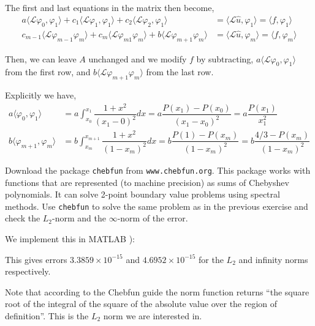 \documentclass[10pt]{article}
\begin{document}
\begin{solution}[Solution]
\begin{enumerate}
        The first and last equations in the matrix then become,
        \begin{align*}
            a\langle \mathcal{L}\varphi_0, \varphi_1\rangle
            + c_1\langle \mathcal{L}\varphi_1, \varphi_1\rangle
            + c_2\langle \mathcal{L}\varphi_2, \varphi_1\rangle
            &= \langle \mathcal{L}\hat{u},\varphi_1 \rangle = \langle f, \varphi_1 \rangle \\ 
            c_{m-1}\langle \mathcal{L}\varphi_{m-1}\varphi_m \rangle
            +c_{m}\langle \mathcal{L}\varphi_{m1}\varphi_m \rangle
            +b\langle \mathcal{L}\varphi_{m+1}\varphi_m \rangle
            &= \langle \mathcal{L}\hat{u},\varphi_m \rangle = \langle f, \varphi_m \rangle 
        \end{align*}
        
        Then, we can leave \( A \) unchanged and we modify \( f \) by subtracting, \( a\langle \mathcal{L}\varphi_0, \varphi_1\rangle \) from the first row, and \( b\langle \mathcal{L}\varphi_{m+1}\varphi_m \rangle \) from the last row.

        Explicitly we have,
        \begin{align*}
            a\langle \varphi_0, \varphi_1 \rangle 
            &= a\int_{x_0}^{x_1} \dfrac{1+x^2}{(x_1-0)^2}dx = a\dfrac{P(x_1)-P(x_0)}{(x_1-x_0)^2} = a \dfrac{P(x_1)}{ x_1^2 }\\
            b\langle \varphi_{m+1}, \varphi_m \rangle 
            &= b \int_{x_m}^{x_{m+1}} \dfrac{1+x^2}{(1-x_m)^2}dx = b \dfrac{P(1)-P(x_m)}{(1-x_m)^2} = b \dfrac{4/3-P(x_m)}{(1-x_m)^2}
        \end{align*}

        

\end{enumerate}

\end{solution}

\begin{problem}
Download the package {\tt chebfun} from {\tt www.chebfun.org}. This package works with functions that are represented (to machine precision) as sums of Chebyshev polynomials. It can solve 2-point boundary value problems using spectral methods.  Use {\tt chebfun} to solve the same problem as in the previous exercise and check the \( L_2 \)-norm and the \( \infty \)-norm of the error. 
\end{problem}

\begin{solution}[Solution]

We implement this in MATLAB ):



This gives errors  \( 3.3859\times 10^{-15} \) and \( 4.6952\times 10^{-15} \) for the \( L_2 \) and infinity norms respectively.

Note that according to the Chebfun guide the norm function returns ``the square root of the integral of the square of the absolute value over the region of definition''. This is the \( L_2 \) norm we are interested in.

\end{solution}
\end{document}
